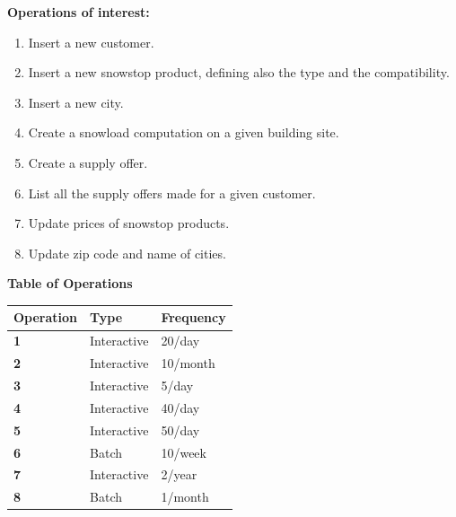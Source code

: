 \documentclass{article}[h]
\begin{document}
{{\textbf{Operations of interest:}

\begin{enumerate}
  \item Insert a new customer.
  \item Insert a new snowstop product, defining also the type and the compatibility.
  \item Insert a new city.
  \item Create a snowload computation on a given building site.
  \item Create a supply offer.
  \item List all the supply offers made for a given customer.
  \item Update prices of snowstop products.
  \item Update zip code and name of cities.
\end{enumerate}

\vspace{12px}

{\centering \textbf{Table of Operations}\\}

\begin{table}[H]
  \def\arraystretch{1.25}%
  \centering
  \begin{tabular}{ | m{2.5cm} | m{3.5cm}| m{3.5cm} |}  
    \hline
    {\textbf{\large Operation}} & {\textbf{\large Type}} & {\textbf{\large Frequency}} \\ 
    \hline
    \color[HTML]{3531FF} \textbf{1} & Interactive & 20/day  \\ 
    \hline
    \color[HTML]{3531FF} \textbf{2} & Interactive & 10/month  \\ 
    \hline
    \color[HTML]{3531FF} \textbf{3} & Interactive & 5/day  \\ 
    \hline
    \color[HTML]{3531FF} \textbf{4} & Interactive & 40/day  \\ 
    \hline
    \color[HTML]{3531FF} \textbf{5} & Interactive & 50/day  \\ 
    \hline
    \color[HTML]{3531FF} \textbf{6} & Batch & 10/week  \\ 
    \hline
    \color[HTML]{3531FF} \textbf{7} & Interactive & 2/year  \\ 
    \hline
    \color[HTML]{3531FF} \textbf{8} & Batch & 1/month  \\ 
    \hline
  \end{tabular}
\end{table}

}}
\end{document}
